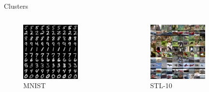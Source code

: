 \documentclass{beamer}
\begin{document}
\begin{frame}[t]{Clusters}\vspace{20pt}
\begin{columns}
\begin{column}{0.6\textwidth}
    \begin{figure}
    \centering
    \includegraphics[width=0.7\textwidth]{mnist_cluster.png}
    \caption{MNIST}
    \end{figure}
\end{column}
\begin{column}{0.6\textwidth}
    \begin{figure}
    \centering
    \includegraphics[width=0.7\textwidth]{stl-10_cluster.png}
    \caption{STL-10}
    \end{figure}
\end{column}

\end{columns}
\end{frame}
\end{document}

